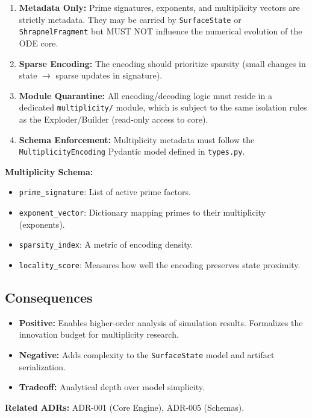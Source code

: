 \documentclass[11pt]{article}
\begin{document}
\begin{enumerate}
    \item \textbf{Metadata Only:} Prime signatures, exponents, and multiplicity vectors are strictly metadata. They may be carried by \texttt{SurfaceState} or \texttt{ShrapnelFragment} but MUST NOT influence the numerical evolution of the ODE core.
    \item \textbf{Sparse Encoding:} The encoding should prioritize sparsity (small changes in state $\to$ sparse updates in signature).
    \item \textbf{Module Quarantine:} All encoding/decoding logic must reside in a dedicated \texttt{multiplicity/} module, which is subject to the same isolation rules as the Exploder/Builder (read-only access to core).
    \item \textbf{Schema Enforcement:} Multiplicity metadata must follow the \texttt{MultiplicityEncoding} Pydantic model defined in \texttt{types.py}.
\end{enumerate}

\textbf{Multiplicity Schema:}
\begin{itemize}
    \item \texttt{prime\_signature}: List of active prime factors.
    \item \texttt{exponent\_vector}: Dictionary mapping primes to their multiplicity (exponents).
    \item \texttt{sparsity\_index}: A metric of encoding density.
    \item \texttt{locality\_score}: Measures how well the encoding preserves state proximity.
\end{itemize}

\subsection{Consequences}
\begin{itemize}
    \item \textbf{Positive:} Enables higher-order analysis of simulation results. Formalizes the innovation budget for multiplicity research.
    \item \textbf{Negative:} Adds complexity to the \texttt{SurfaceState} model and artifact serialization.
    \item \textbf{Tradeoff:} Analytical depth over model simplicity.
\end{itemize}

\textbf{Related ADRs:} ADR-001 (Core Engine), ADR-005 (Schemas).
\end{document}
